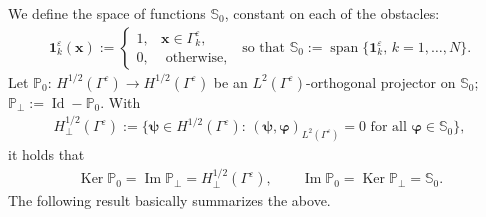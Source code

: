 \documentclass[]{article}
\numberwithin{equation}{section}
\numberwithin{theorem}{section}
\numberwithin{lemma}{section}
\numberwithin{corollary}{section}
\numberwithin{proposition}{section}
\numberwithin{definition}{section}
\newcommand{\re}{\varepsilon}
\renewcommand{\vec}{\boldsymbol}
\begin{document}
	We define the space of functions $\mathbb{S}_0$, constant on each of the obstacles:   
	\begin{align}%
		\label{eq:S0}
		\vec{1}_k^{\re}(\vec{x}):=\left\{
		\begin{array}{ll}
			1, & \vec{x}\in \Gamma_k^{\re},\\
			0, & \text{ otherwise, }
		\end{array}
		\right. \text{ so that }	\mathbb{S}_0:=\operatorname{span}\{\mathbf{1}_k^{\re},\, k=1, \ldots, N\}.	
	\end{align} 
	Let $\mathbb{P}_0: \, H^{1/2}(\Gamma^{\re})\rightarrow H^{1/2}(\Gamma^{\re})$ be an $L^2(\Gamma^{\re})$-orthogonal projector on $\mathbb{S}_0$;  $\mathbb{P}_{\perp}:=\operatorname{Id}-\mathbb{P}_0$. With 
	\begin{align*}%
		H^{1/2}_{\perp}(\Gamma^{\re}):=\{\vec{\psi} \in H^{1/2}(\Gamma^{\re}): \, (\vec{\psi}, \vec{\varphi})_{L^2(\Gamma^{\re})}=0 \text{ for all }\vec{\varphi}\in \mathbb{S}_0\},
	\end{align*}
	it holds that 
	\begin{align}
		\label{eq:p0perp}
		\operatorname{Ker}\mathbb{P}_0=\operatorname{Im} \mathbb{P}_{\perp}=H^{1/2}_{\perp}(\Gamma^{\re}), \qquad \operatorname{Im}\mathbb{P}_0=\operatorname{Ker} \mathbb{P}_{\perp}=\mathbb{S}_0.
	\end{align}
	The following result basically summarizes the above.
\end{document}
